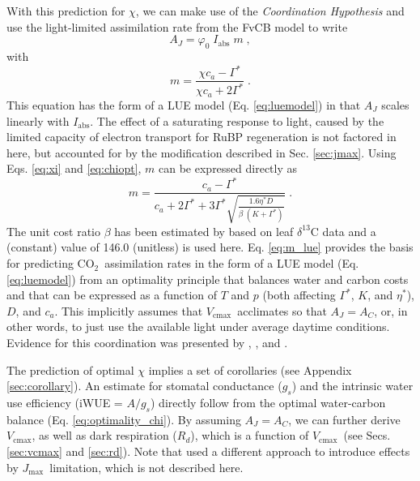 \documentclass{myreport}
\newcommand{\coo}{CO$_2$}
\newcommand{\vcmax}{$V_{\text{cmax}}$}
\newcommand{\jmax}{$J_{\text{max}}$}
\begin{document}
With this prediction for $\chi$, we can make use of the \textit{Coordination Hypothesis} and use the light-limited assimilation rate from the FvCB model to write
\begin{equation}
        A_J = \varphi_0 \; I_{\mathrm{abs}}\;m \;,
\end{equation}
with
\begin{equation}
    m = \frac{\chi c_a - \Gamma^{\ast}}{\chi c_a + 2\Gamma^{\ast}}\;.
\end{equation}
This equation has the form of a LUE model (Eq. \ref{eq:luemodel}) in that $A_J$ scales linearly with $I_{\mathrm{abs}}$. The effect of a saturating response to light, caused by the limited capacity of electron transport for RuBP regeneration is not factored in here, but accounted for by the modification described in Sec. \ref{sec:jmax}. Using Eqs. \ref{eq:xi} and \ref{eq:chiopt}, $m$ can be expressed directly as
\begin{equation}
\label{eq:m_lue}
    m = \frac{c_a - \Gamma^{\ast}}{c_a + 2 \Gamma^{\ast} + 3 \Gamma^{\ast} \sqrt{\frac{1.6 \eta^{\ast} D }{\beta\;(K+\Gamma^{\ast})}}} \;.
\end{equation}
The unit cost ratio $\beta$ has been estimated by \cite{wang17natpl} based on leaf $\delta^{13}$C data and a (constant) value of 146.0 (unitless) is used here. Eq. \ref{eq:m_lue} provides the basis for predicting \coo\ assimilation rates in the form of a LUE model (Eq. \ref{eq:luemodel}) from an optimality principle that balances water and carbon costs and that can be expressed as a function of $T$ and $p$ (both affecting $\Gamma^{\ast}$, $K$, and $\eta^\ast$), $D$, and $c_a$. This implicitly assumes that \vcmax\ acclimates so that $A_J=A_C$, or, in other words, to just use the available light under average daytime conditions. Evidence for this coordination was presented by \cite{chen93}, \cite{haxeltine96}, and \cite{maire12po}. 

The prediction of optimal $\chi$ implies a set of corollaries (see Appendix \ref{sec:corollary}). An estimate for stomatal conductance ($g_s$) and the intrinsic water use efficiency (iWUE = $A/g_s$) directly follow from the optimal water-carbon balance (Eq. \ref{eq:optimality_chi}). By assuming $A_J=A_C$, we can further derive \vcmax , as well as dark respiration ($R_d$), which is a function of \vcmax\ (see Secs. \ref{sec:vcmax} and \ref{sec:rd}). Note that \cite{smith19ecollett} used a different approach to introduce effects by \jmax\ limitation, which is not described here.
\end{document}
